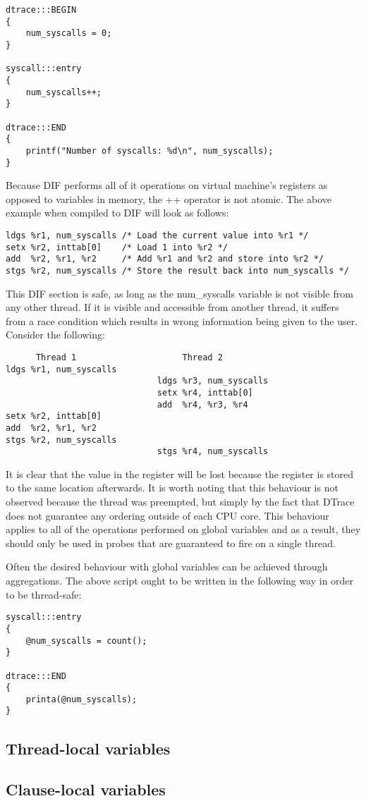 \begin{verbatim}
dtrace:::BEGIN
{
    num_syscalls = 0;
}

syscall:::entry
{
    num_syscalls++;
}

dtrace:::END
{
    printf("Number of syscalls: %d\n", num_syscalls);
}
\end{verbatim}

\noindent
Because DIF performs all of it operations on virtual machine's registers as opposed
to variables in memory, the ++ operator is not atomic. The above example when compiled
to DIF will look as follows:

\begin{verbatim}
ldgs %r1, num_syscalls /* Load the current value into %r1 */
setx %r2, inttab[0]    /* Load 1 into %r2 */
add  %r2, %r1, %r2     /* Add %r1 and %r2 and store into %r2 */
stgs %r2, num_syscalls /* Store the result back into num_syscalls */
\end{verbatim}

\noindent
This DIF section is safe, as long as the num\_syscalls variable is not visible from any
other thread. If it is visible and accessible from another thread, it suffers from a race
condition which results in wrong information being given to the user. Consider the following:

\begin{verbatim}
      Thread 1                     Thread 2
ldgs %r1, num_syscalls
                              ldgs %r3, num_syscalls
                              setx %r4, inttab[0]
                              add  %r4, %r3, %r4
setx %r2, inttab[0]
add  %r2, %r1, %r2
stgs %r2, num_syscalls
                              stgs %r4, num_syscalls
\end{verbatim}

\noindent
It is clear that the value in the  register will be lost because the register
 is stored to the same location afterwards. It is worth noting that this
behaviour is not observed because the thread was preempted, but simply by the fact that DTrace
does not guarantee any ordering outside of each CPU core. This behaviour applies to all of the
operations performed on global variables and as a result, they should only be used in probes that
are guaranteed to fire on a single thread.

\noindent
Often the desired behaviour with global variables can be achieved through aggregations. The above
script ought to be written in the following way in order to be thread-safe:

\begin{verbatim}
syscall:::entry
{
    @num_syscalls = count();
}

dtrace:::END
{
    printa(@num_syscalls);
}
\end{verbatim}

\subsection{Thread-local variables}

\subsection{Clause-local variables}